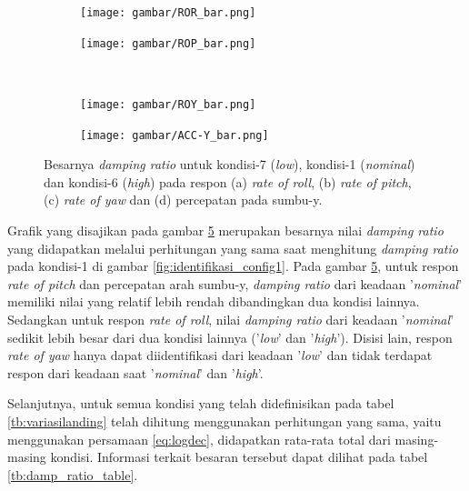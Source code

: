 \begin{figure}[H]
	\centering
	\begin{subfigure}{0.48\textwidth}
		\centering
		\texttt{[image: gambar/ROR\_bar.png]}
		\caption{}
		\label{fig:ROR_1,6,7}
	\end{subfigure}
	\centering
	\begin{subfigure}{0.48\textwidth}
		\centering
		\texttt{[image: gambar/ROP\_bar.png]}
		\caption{}
		\label{fig:ROP_1,6,7}
	\end{subfigure}
	\\
	\centering
	\begin{subfigure}{0.48\textwidth}
		\centering
		\texttt{[image: gambar/ROY\_bar.png]}
		\caption{}
		\label{fig:ROY_1,6,7}
	\end{subfigure}
	\centering
	\begin{subfigure}{0.48\textwidth}
		\centering
		\texttt{[image: gambar/ACC-Y\_bar.png]}
		\caption{}
		\label{fig:ACC-y_1,6,7}
	\end{subfigure}
		\caption{Besarnya \textit{damping ratio} untuk kondisi-7 (\textit{low}), kondisi-1 (\textit{nominal}) dan kondisi-6 (\textit{high}) pada respon (a) \textit{rate of roll}, (b) \textit{rate of pitch}, (c) \textit{rate of yaw} dan (d) percepatan pada sumbu-y.}
		\label{fig:damp_ratio_1,6,7}
\end{figure}

Grafik yang disajikan pada gambar \ref{fig:damp_ratio_1,6,7} merupakan besarnya nilai \textit{damping ratio} yang didapatkan melalui perhitungan yang sama saat menghitung \textit{damping ratio} pada kondisi-1 di gambar \ref{fig:identifikasi_config1}. Pada gambar \ref{fig:damp_ratio_1,6,7}, untuk respon \textit{rate of pitch} dan percepatan arah sumbu-y, \textit{damping ratio} dari keadaan '\textit{nominal}' memiliki nilai yang relatif lebih rendah dibandingkan dua kondisi lainnya. Sedangkan untuk respon \textit{rate of roll}, nilai \textit{damping ratio} dari keadaan '\textit{nominal}' sedikit lebih besar dari dua kondisi lainnya ('\textit{low}' dan '\textit{high}'). Disisi lain, respon \textit{rate of yaw} hanya dapat diidentifikasi dari keadaan '\textit{low}' dan tidak terdapat respon dari keadaan saat '\textit{nominal}' dan '\textit{high}'.

Selanjutnya, untuk semua kondisi yang telah didefinisikan pada tabel \ref{tb:variasilanding} telah dihitung menggunakan perhitungan yang sama, yaitu menggunakan persamaan \ref{eq:logdec}, didapatkan rata-rata total dari masing-masing kondisi. Informasi terkait besaran tersebut dapat dilihat pada tabel \ref{tb:damp_ratio_table}. 

